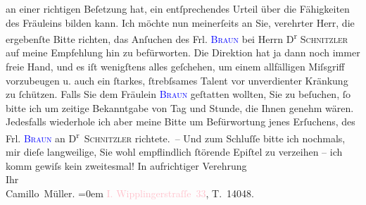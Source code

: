                an einer richtigen Beſetzung hat, ein entſprechendes Urteil über die Fähigkeiten des
               Fräuleins bilden kann.\pend
           \pstart
           Ich möchte nun meinerſeits an Sie, verehrter Herr, die ergebenſte Bitte richten, das
                  {\pb}Anſuchen des Frl. \textcolor{blue}{\textsc{Braun}}{}\ledrightnote{\textcolor{blue}{Thekla Maria Braun}} bei Herrn D\textsuperscript{r}{ }\textsc{Schnitzler} auf meine Empfehlung hin zu befürworten. Die
               Direktion hat ja dann noch immer freie Hand, und es iſt wenigſtens alles geſchehen,
               um einem allfälligen Miſsgriff vorzubeugen u. auch ein ſtarkes, ſtrebſsames Talent
               vor unverdienter Kränkung zu ſchützen.\pend
           \pstart
           Falls Sie dem Fräulein \textcolor{blue}{\textsc{Braun}}{}\ledrightnote{\textcolor{blue}{Thekla Maria Braun}} geſtatten wollten, Sie zu beſuchen, ſo bitte ich um zeitige Bekanntgabe von Tag
               und Stunde, die Ihnen {\pb}genehm
               wären. Jedesfalls wiederhole ich aber meine Bitte um Befürwortung jenes Erſuchens,
               des Frl. \textcolor{blue}{\textsc{Braun}}{}\ledrightnote{\textcolor{blue}{Thekla Maria Braun}} an D\textsuperscript{r} \textsc{Schnitzler}
               richtete. –\pend
           \pstart
           Und zum Schluſſe bitte ich nochmals, mir dieſe langweilige, Sie wohl empflindlich
               ſtörende Epiſtel zu verzeihen – ich komm gewiſs kein zweitesmal!\pend
           \pstart
           In aufrichtiger Verehrung{\\[\baselineskip]}Ihr{\\[\baselineskip]}\spacefill\mbox{Camillo Müller.}\pend
           \leftskip=0em{}\pstart
           \noindent{}\textcolor{pink}{I. Wipplingerstraſſe 33}{}\ledrightnote{\textcolor{pink}{Wipplingerstraße}}, T. 14048.\pend
           \pstart
           \label{T_L01796_1v}\label{T_L01796_1h}\pend
           \endnumbering{}  
      